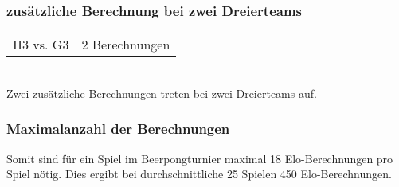 \documentclass[a5paper, 12pt]{article}
\begin{document}
\subsubsection{zusätzliche Berechnung bei zwei Dreierteams}
\begin{tabular}[h]{ll}
H3 vs. G3 & 2 Berechnungen \\
\end{tabular}
\\Zwei zusätzliche Berechnungen treten bei zwei Dreierteams auf.
\subsubsection{Maximalanzahl der Berechnungen}
Somit sind für ein Spiel im Beerpongturnier maximal 18 Elo-Berechnungen pro Spiel nötig. Dies ergibt bei durchschnittliche 25 Spielen 450 Elo-Berechnungen.
\end{document}
